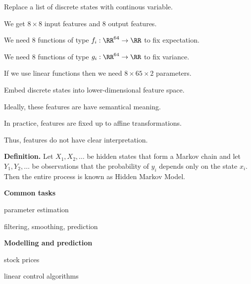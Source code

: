 \documentclass[landscape,footrule]{foils}
\begin{document}
\begin{triangles}
\item Replace a list of discrete states with continous variable.
 \begin{diamonds}
 \item We get $8\times 8$ input features and $8$ output features. 
 \item We need 8 functions of type $f_i:\RR^{64}\to \RR$ to fix expectation.
 \item We need 8 functions of type $g_i:\RR^{64}\to \RR$ to fix variance.
 \item If we use linear functions then we need $8\times 65\times 2$ parameters.
 \vspace{2ex} 
 \end{diamonds}
\item Embed discrete states into lower-dimensional feature space.
 \begin{diamonds}
 \item Ideally, these features are have semantical meaning.
 \item In practice, features are fixed up to affine transformations. 
 \item Thus, features do not have clear interpretation.   

 \end{diamonds}  
   
\end{triangles}

 


\textbf{Definition.}
Let $X_1,X_2,\ldots$ be hidden states that form a Markov chain and let $Y_1,Y_2,\ldots$ be observations that the probability of $y_i$ depends only on the state $x_i$. Then the entire process is known as Hidden Markov Model.\vspace*{1ex}

\textbf{Common tasks}
\begin{triangles}
\item parameter estimation 
\item filtering, smoothing, prediction
\end{triangles}



\textbf{Modelling and prediction}
\begin{triangles}
\item stock prices
\item linear control algorithms 
\end{triangles}\vspace*{2ex}
\end{document}
